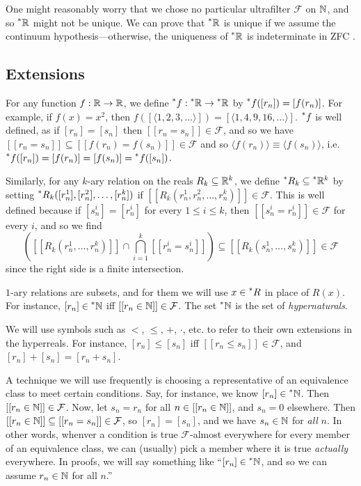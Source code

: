 One might reasonably worry that we chose no particular ultrafilter $\mathcal{F}$ on $\mathbb{N}$, and so $\prescript{*}{}{\mathbb{R}}$ might not be unique. We can prove that $\prescript{*}{}{\mathbb{R}}$ is unique if we assume the continuum hypothesis---otherwise, the uniqueness of $\prescript{*}{}{\mathbb{R}}$ is indeterminate in ZFC \cite[33]{goldblatt1998}.

\subsection{Extensions}\label{sec:extensions}

For any function $f: \mathbb{R} \to \mathbb{R}$, we define $\prescript{*}{}{f}: \prescript{*}{}{\mathbb{R}} \to \prescript{*}{}{\mathbb{R}}$ by $\prescript{*}{}{f}([r_n]) = [f(r_n)]$. For example, if $f(x) = x^2$, then $f([\langle 1, 2, 3, \ldots \rangle]) = [\langle 1, 4, 9, 16, \ldots \rangle]$. $\prescript{*}{}{f}$ is well defined, as if $[r_n] = [s_n]$ then $[[r_n = s_n]] \in \mathcal{F}$, and so we have $[[r_n = s_n]] \subseteq [[f(r_n) = f(s_n)]] \in \mathcal{F}$ and so $\langle f(r_n) \rangle \equiv \langle f(s_n) \rangle$, i.e. $\prescript{*}{}{f}([r_n]) = [f(r_n)] = [f(s_n)] = \prescript{*}{}{f}([s_n])$.

Similarly, for any $k$-ary relation on the reals $R_k \subseteq \mathbb{R}^k$, we define $\prescript{*}{}{R}_k \subseteq \prescript{*}{}{\mathbb{R}}^k$ by setting $\prescript{*}{}{R}_k([r_n^1], [r_n^2], \ldots, [r_n^k])$ if $[[R_k(r_n^1, r_n^2, \ldots, r_n^k)]] \in \mathcal{F}$. This is well defined because if $[s_n^i] = [r_n^i]$ for every $1 \leq i \leq k$, then $[[s_n^i = r_n^i]] \in \mathcal{F}$ for every $i$, and so we find
\[
\left([[R_k(r_n^1, \ldots, r_n^k)]] \cap \bigcap_{i = 1}^k [[r_n^i = s_n^i]]\right) \subseteq [[R_k(s_n^1, \ldots, s_n^k)]] \in \mathcal{F}
\]
since the right side is a finite intersection.

$1$-ary relations are subsets, and for them we will use $x \in \prescript{*}{}{R}$ in place of $R(x)$. For instance, $[r_n] \in \prescript{*}{}{\mathbb{N}}$ iff $[[r_n \in \mathbb{N}]] \in \mathcal{F}$. The set $\prescript{*}{}{\mathbb{N}}$ is the set of \textit{hypernaturals}.

We will use symbols such as $<$, $\leq$, $+$, $\cdot$, etc. to refer to their own extensions in the hyperreals. For instance, $[r_n] \leq [s_n]$ iff $[[r_n \leq s_n]] \in \mathcal{F}$, and $[r_n] + [s_n] = [r_n + s_n]$.

A technique we will use frequently is choosing a representative of an equivalence class to meet certain conditions. Say, for instance, we know $[r_n] \in \prescript{*}{}{\mathbb{N}}$. Then $[[r_n \in \mathbb{N}]] \in \mathcal{F}$. Now, let $s_n = r_n$ for all $n \in [[r_n \in \mathbb{N}]]$, and $s_n = 0$ elsewhere. Then $[[r_n \in \mathbb{N}]] \subseteq [[r_n = s_n]] \in \mathcal{F}$, so $[r_n] = [s_n]$, and we have $s_n \in \mathbb{N}$ for \textit{all} $n$. In other words, whenver a condition is true $\mathcal{F}$-almost everywhere for every member of an equivalence class, we can (usually) pick a member where it is true \textit{actually} everywhere. In proofs, we will say something like ``$[r_n] \in \prescript{*}{}{\mathbb{N}}$, and so we can assume $r_n \in \mathbb{N}$ for all $n$.''

